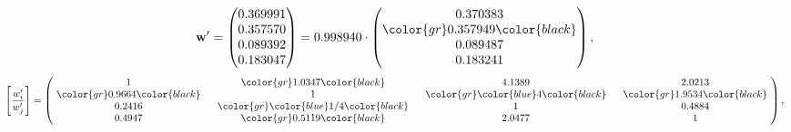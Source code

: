 \begin{example}
\begin{equation*}
\mathbf{w}^{\prime} =
\begin{pmatrix}
0.369991\\
0.357570\\
0.089392\\
0.183047
\end{pmatrix} =
0.998940\cdot
\begin{pmatrix}
0.370383\\
\color{gr} 0.357949\color{black} \\
0.089487\\
0.183241
\end{pmatrix},
\end{equation*}
\begin{equation*}
\left[ \frac{{w}^{\prime}_i}{{w}^{\prime}_j} \right] =
\begin{pmatrix}
$\,\,$ 1 $\,\,$ & $\,\,$\color{gr} 1.0347\color{black} $\,\,$ & $\,\,$4.1389$\,\,$ & $\,\,$2.0213$\,\,$ \\
$\,\,$\color{gr} 0.9664\color{black} $\,\,$ & $\,\,$ 1 $\,\,$ & $\,\,$\color{gr} \color{blue} 4\color{black} $\,\,$ & $\,\,$\color{gr} 1.9534\color{black}   $\,\,$ \\
$\,\,$0.2416$\,\,$ & $\,\,$\color{gr} \color{blue}  1/4\color{black} $\,\,$ & $\,\,$ 1 $\,\,$ & $\,\,$0.4884 $\,\,$ \\
$\,\,$0.4947$\,\,$ & $\,\,$\color{gr} 0.5119\color{black} $\,\,$ & $\,\,$2.0477$\,\,$ & $\,\,$ 1  $\,\,$ \\
\end{pmatrix},
\end{equation*}
\end{example}
\newpage
